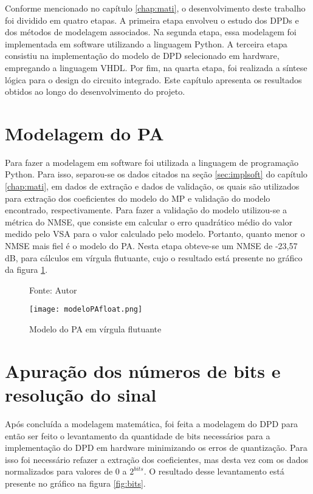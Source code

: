 Conforme mencionado no capítulo \ref{chap:mati}, o desenvolvimento deste trabalho foi dividido em quatro etapas. A primeira etapa envolveu o estudo dos DPDs e dos métodos de modelagem associados. Na segunda etapa, essa modelagem foi implementada em software utilizando a linguagem Python. A terceira etapa consistiu na implementação do modelo de DPD selecionado em hardware, empregando a linguagem VHDL. Por fim, na quarta etapa, foi realizada a síntese lógica para o design do circuito integrado. Este capítulo apresenta os resultados obtidos ao longo do desenvolvimento do projeto.

\section{Modelagem do PA}

Para fazer a modelagem em software foi utilizada a linguagem de programação Python. Para isso, separou-se os dados citados na seção \ref{sec:implsoft} do capítulo \ref{chap:mati}, em dados de extração e dados de validação, os quais são utilizados para extração dos coeficientes do modelo do MP e validação do modelo encontrado, respectivamente. Para fazer a validação do modelo utilizou-se a métrica do NMSE, que consiste em calcular o erro quadrático médio do valor medido pelo VSA para o valor calculado pelo modelo. Portanto, quanto menor o NMSE mais fiel é o modelo do PA. Nesta etapa obteve-se um NMSE de -23,57 dB, para cálculos em vírgula flutuante, cujo o resultado está presente no gráfico da figura \ref{fig:modelopafloat}.

\begin{figure}[htbp!]
    \centering
    \captionsetup{justification=centering}
    \caption*{Fonte: Autor}
    \texttt{[image: modeloPAfloat.png]}
    \caption{Modelo do PA em vírgula flutuante}
    \label{fig:modelopafloat}
\end{figure}

\section{Apuração dos números de bits e resolução do sinal} 

Após concluída a modelagem matemática, foi feita a modelagem do DPD para então ser feito o levantamento da quantidade de bits necessários para a implementação do DPD em hardware minimizando os erros de quantização. 
Para isso foi necessário refazer a extração dos coeficientes, mas desta vez com os dados normalizados para valores de 0 a $2^{bits}$.  
O resultado desse levantamento está presente no gráfico na figura \ref{fig:bits}.

